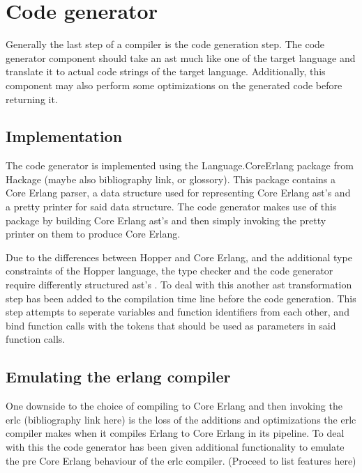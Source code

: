 \section{Code generator}

Generally the last step of a compiler is the code generation step. The code generator
component should take an \gls{ast} much like one of the target language and translate it
to actual code strings of the target language. Additionally, this component may also
perform some optimizations on the generated code before returning it.

\subsection{Implementation}

The code generator is implemented using the Language.CoreErlang \cite{CoreErlang} package
from Hackage (maybe also bibliography link, or glossory). This package contains a Core Erlang
parser, a data structure used for representing Core Erlang \gls{ast}'s and a pretty printer for
said data structure. The code generator makes use of this package by building Core Erlang
\gls{ast}'s and then simply invoking the pretty printer on them to  produce Core Erlang.

Due to the differences between Hopper and Core Erlang, and the additional type constraints
of the Hopper language, the type checker and the code generator require differently
structured \gls{ast}'s . To deal with this another \gls{ast} transformation step has been added
to the compilation time line before the code generation. This step attempts to seperate variables
and function identifiers from each other, and bind function calls with the tokens that
should be used as parameters in said function calls.

\subsection{Emulating the erlang compiler}

One downside to the choice of compiling to Core Erlang and then invoking the erlc
(bibliography link here) is the loss of the additions and optimizations the erlc
compiler makes when it compiles Erlang to Core Erlang in its pipeline. To deal with this
the code generator has been given additional functionality to emulate the pre Core Erlang
behaviour of the erlc compiler. (Proceed to list features here)
